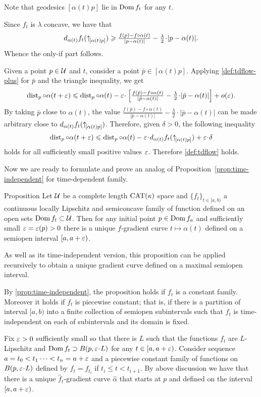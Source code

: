 \documentclass[oneside,a4paper, 12pt]{article}
\begin{document}
Note that geodesics $[\alpha(t)p]$ lie in $\mathop{\rm Dom}\nolimits f_t$ for any $t$.

Since $f_t$ is $\lambda$ concave, we have that 
\[d_{\alpha(t)}f_t(\dir{\alpha(t)}p)\ge \tfrac{f(p)-f\circ\alpha(t)}{|p-\alpha(t)|}-\tfrac\lambda2\cdot |p-\alpha(t)|.\]
Whence the only-if part follows.

Given a point $p\in \mathcal{U}$ and $t$,
consider a point $\bar p\in [\alpha(t)p]$.
Applying \ref{def:tdflow-plus} for $\bar p$ and the triangle inequality, we get
\[\dist_p\circ\alpha(t+\eps)\le \dist_p\circ\alpha(t)-\eps\cdot \left[\tfrac{f(\bar p)-f\circ\alpha(t)}{|\bar p-\alpha(t)|}-\tfrac\lambda2\cdot |\bar p-\alpha(t)|\right]+o(\eps).\]
By taking $\bar p$ close to $\alpha(t)$,
the value $\tfrac{f(\bar p)-f\circ\alpha(t)}{|\bar p-\alpha(t)|}-\tfrac\lambda2\cdot |\bar p-\alpha(t)|$ can be made arbitrary close to $d_{\alpha(t)}f_t({\uparrow}_{\![{\alpha(t)}{p}]})$.
Therefore, given $\delta>0$, the following inequality
\[\dist_p\circ\alpha(t+\eps)\le \dist_p\circ\alpha(t)-\eps\cdot d_{\alpha(t)}f_t(\dir{\alpha(t)}p)+\eps\cdot\delta\]
holds for all sufficiently small positive values $\varepsilon$.
Therefore \ref{def:tdflow} holds.
\qeds


Now we are ready to formulate and prove an analog of Proposition~\ref{prop:time-independent} for time-dependent family.

\begin{thm}{Proposition}\label{prop:time-dependent}
Let $\mathcal{U}$ be a complete length $\mathrm{CAT}(\kappa)$ space and
$\{f_t\}_{t\in[a,b)}$ a continuous locally Lipschitz and semiconcave family of function defined on an open sets $\mathop{\rm Dom}\nolimits f_t\subset {\mathcal{U}}$.
Then for any initial point $p\in \mathop{\rm Dom}\nolimits f_a$ and sufficiently small $\varepsilon=\varepsilon(p)>0$ there is a unique $f$-gradient curve $t\mapsto\alpha(t)$ defined on a semiopen interval $[a,a+\varepsilon)$. 
\end{thm}

As well as its time-independent version, this proposition can be applied recursively to obtain a unique gradient curve defined on a maximal semiopen interval.

By \ref{prop:time-independent}, the proposition holds if $f_t$ is a constant family.
Moreover it holds if $f_t$ is piecewise constant;
that is, if there is a partition of interval $[a,b)$ into a finite collection of semiopen subintervals such that $f_t$ is time-independent on each of subintervals and its domain is fixed.

Fix $\varepsilon>0$ sufficiently small so that there is $L$ such that the functions $f_t$ are $L$-Lipschitz and $\Dom f_t\supset B(p,\eps\cdot L)$ for any $t\in[a,a+\varepsilon)$.
Consider sequence  $a=t_0<t_1\dots<t_n\z=a+\eps$ and a piecewise constant family of functions on $B(p,\eps\cdot L)$ defined by $\hat f_t=f_{t_i}$ if $t_i\le t<t_{i+1}$.
By above discussion we have that there is a unique $\hat f_t$-gradient curve $\hat \alpha$ that starts at $p$ and defined on the interval $[a,a+\varepsilon)$.
\end{document}
